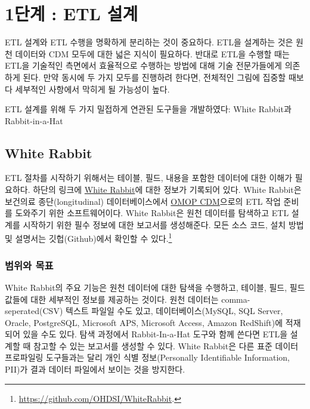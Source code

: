 \documentclass[11pt]{book}
\let\rmarkdownfootnote\footnote%
\def\footnote{\protect\rmarkdownfootnote}
\theoremstyle{definition}
\theoremstyle{definition}
\theoremstyle{definition}
\theoremstyle{remark}
\begin{document}
\section{1단계 : ETL 설계}\label{-etl-}

ETL 설계와 ETL 수행을 명확하게 분리하는 것이 중요하다. ETL을 설계하는
것은 원천 데이터와 CDM 모두에 대한 넓은 지식이 필요하다. 반대로 ETL을
수행할 때는 ETL을 기술적인 측면에서 효율적으로 수행하는 방법에 대해 기술
전문가들에게 의존하게 된다. 만약 동시에 두 가지 모두를 진행하려 한다면,
전체적인 그림에 집중할 때보다 세부적인 사항에서 막히게 될 가능성이 높다.

ETL 설계를 위해 두 가지 밀접하게 연관된 도구들을 개발하였다: White
Rabbit과 Rabbit-in-a-Hat

\subsection{White Rabbit}\label{white-rabbit}

ETL 절차를 시작하기 위해서는 테이블, 필드, 내용을 포함한 데이터에 대한
이해가 필요하다. 하단의 링크에
\href{https://github.com/OHDSI/WhiteRabbit}{White Rabbit}에 대한 정보가
기록되어 있다. White Rabbit은 보건의료 종단(longitudinal)
데이터베이스에서 \href{https://github.com/OHDSI/CommonDataModel}{OMOP
CDM}으로의 ETL 작업 준비를 도와주기 위한 소프트웨어이다. White Rabbit은
원천 데이터를 탐색하고 ETL 설계를 시작하기 위한 필수 정보에 대한
보고서를 생성해준다. 모든 소스 코드, 설치 방법 및 설명서는
깃헙(Github)에서 확인할 수 있다.\footnote{\url{https://github.com/OHDSI/WhiteRabbit}.}
 

\subsubsection*{범위와 목표}\label{-}

White Rabbit의 주요 기능은 원천 데이터에 대한 탐색을 수행하고, 테이블,
필드, 필드 값들에 대한 세부적인 정보를 제공하는 것이다. 원천 데이터는
comma-seperated(CSV) 텍스트 파일일 수도 있고, 데이터베이스(MySQL, SQL
Server, Oracle, PostgreSQL, Microsoft APS, Microsoft Access, Amazon
RedShift)에 적재되어 있을 수도 있다. 탐색 과정에서 Rabbit-In-a-Hat
도구와 함께 쓴다면 ETL을 설계할 때 참고할 수 있는 보고서를 생성할 수
있다. White Rabbit은 다른 표준 데이터 프로파일링 도구들과는 달리 개인
식별 정보(Personally Identifiable Information, PII)가 결과 데이터
파일에서 보이는 것을 방지한다.
\end{document}
